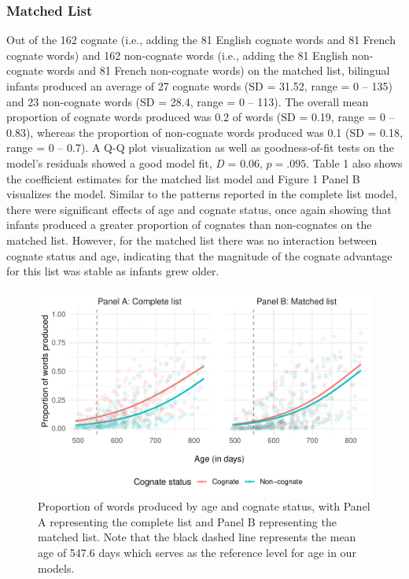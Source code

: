 \documentclass[
  english,
  ,man,floatsintext]{apa6}
\begin{document}
\hypertarget{matched-list}{%
\subsubsection{Matched List}\label{matched-list}}

Out of the 162 cognate (i.e., adding the 81 English cognate words and 81 French cognate words) and 162 non-cognate words (i.e., adding the 81 English non-cognate words and 81 French non-cognate words) on the matched list, bilingual infants produced an average of 27 cognate words (SD = 31.52, range = 0 -- 135) and 23 non-cognate words (SD = 28.4, range = 0 -- 113). The overall mean proportion of cognate words produced was 0.2 of words (SD = 0.19, range = 0 -- 0.83), whereas the proportion of non-cognate words produced was 0.1 (SD = 0.18, range = 0 -- 0.7). A Q-Q plot visualization as well as goodness-of-fit tests on the model's residuals showed a good model fit, \emph{D} = 0.06, \(p = .095\). Table 1 also shows the coefficient estimates for the matched list model and Figure 1 Panel B visualizes the model. Similar to the patterns reported in the complete list model, there were significant effects of age and cognate status, once again showing that infants produced a greater proportion of cognates than non-cognates on the matched list. However, for the matched list there was no interaction between cognate status and age, indicating that the magnitude of the cognate advantage for this list was stable as infants grew older.

\begin{figure}

{\centering \includegraphics[width=1.2\linewidth]{CogVocab_paper_files/figure-latex/Fig1-1} 

}

\caption{Proportion of words produced by age and cognate status, with Panel A representing the complete list and Panel B representing the matched list. Note that the black dashed line represents the mean age of 547.6 days which serves as the reference level for age in our models.}\label{fig:Fig1}
\end{figure}
\end{document}
